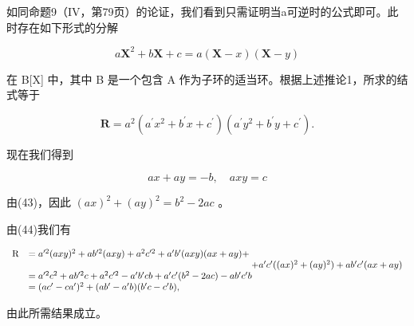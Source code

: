 如同命题9（IV，第79页）的论证，我们看到只需证明当a可逆时的公式即可。此时存在如下形式的分解

\[
a \mathbf {X} ^ {2} + b \mathbf {X} + c = a (\mathbf {X} - x) (\mathbf {X} - y)\tag{43}
\]

在 B{[}X{]} 中，其中 B 是一个包含 A 作为子环的适当环。根据上述推论1，所求的结式等于

\[
\mathbf {R} = a ^ {2} \left(a ^ {\prime} x ^ {2} + b ^ {\prime} x + c ^ {\prime}\right) \left(a ^ {\prime} y ^ {2} + b ^ {\prime} y + c ^ {\prime}\right).\tag{44}
\]

现在我们得到

\[
a x + a y = - b, \quad a x y = c
\]

由(43)，因此 \((ax)^2 + (ay)^2 = b^2 - 2ac\) 。

由(44)我们有

\[
\begin{array}{r l} \mathrm{R} & = a ^ {\prime 2} (a x y) ^ {2} + a b ^ {\prime 2} (a x y) + a ^ {2} c ^ {\prime 2} + a ^ {\prime} b ^ {\prime} (a x y) (a x + a y) + \\ & \qquad \qquad \qquad \qquad \qquad \qquad \qquad \qquad \qquad \qquad \qquad \qquad + a ^ {\prime} c ^ {\prime} ((a x) ^ {2} + (a y) ^ {2}) + a b ^ {\prime} c ^ {\prime} (a x + a y) \\ & = a ^ {\prime 2} c ^ {2} + a b ^ {\prime 2} c + a ^ {2} c ^ {\prime 2} - a ^ {\prime} b ^ {\prime} c b + a ^ {\prime} c ^ {\prime} (b ^ {2} - 2 a c) - a b ^ {\prime} c ^ {\prime} b \\ & = (a c ^ {\prime} - c a ^ {\prime}) ^ {2} + (a b ^ {\prime} - a ^ {\prime} b) (b ^ {\prime} c - c ^ {\prime} b), \end{array}
\]

由此所需结果成立。

